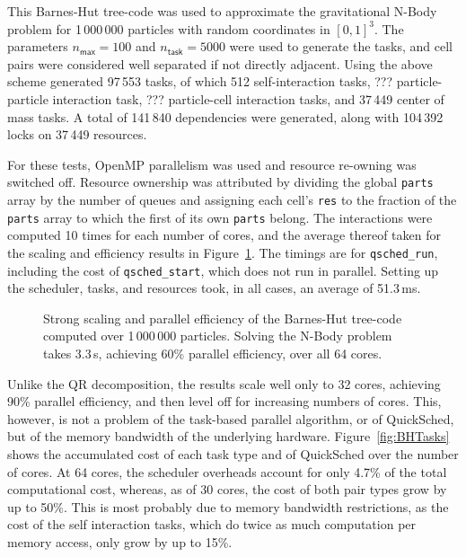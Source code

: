 \documentclass[preprint]{elsarticle}
\newcommand{\fig}[1]
    {Figure~\ref{fig:#1}}
\begin{document}
This Barnes-Hut tree-code was used to approximate the gravitational
N-Body problem for 1\,000\,000 particles with random coordinates
in $[0,1]^3$.
The parameters $n_\mathsf{max}=100$ and $n_\mathsf{task}=5000$
were used to generate the tasks, and cell pairs were considered
well separated if not directly adjacent.
Using the above scheme generated 97\,553 tasks, of which
512 self-interaction tasks, ??? particle-particle interaction
task, ??? particle-cell interaction tasks, and 37\,449
center of mass tasks.
A total of 141\,840 dependencies were generated, along with
104\,392 locks on 37\,449 resources.

For these tests, OpenMP parallelism was used and resource
re-owning was switched off.
Resource ownership was attributed by dividing the global
{\tt parts} array by the number of queues and assigning each cell's
{\tt res} to the fraction of the {\tt parts} array to which
the first of its own {\tt parts} belong.
The interactions were computed 10 times for each number of
cores, and the average thereof taken for the scaling and
efficiency results in \fig{BHResults}.
The timings are for {\tt qsched\_run}, including the cost of
{\tt qsched\_start}, which does not run in parallel.
Setting up the scheduler, tasks, and resources took, in all
cases, an average of 51.3\,ms.

\begin{figure}
    \centerline{}
    \caption{Strong scaling and parallel efficiency of the Barnes-Hut tree-code
        computed over 1\,000\,000 particles.
        Solving the N-Body problem takes 3.3\,s, achieving 60\% parallel
        efficiency, over all 64 cores.
        }
    \label{fig:BHResults}
\end{figure}

Unlike the QR decomposition, the results scale well only to
32 cores, achieving 90\% parallel efficiency, and then
level off for increasing numbers of cores.
This, however, is not a problem of the task-based parallel
algorithm, or of QuickSched, but of the memory bandwidth
of the underlying hardware.
\fig{BHTasks} shows the accumulated cost of each task type and of 
QuickSched over the number of cores.
At 64 cores, the scheduler overheads account for only 4.7\% of
the total computational cost, whereas,
as of 30 cores, the cost of both pair types grow by up to
50\%.
This is most probably due to memory bandwidth restrictions, as
the cost of the self interaction tasks, which do twice as much
computation per memory access, only grow by up to 15\%.
\end{document}
